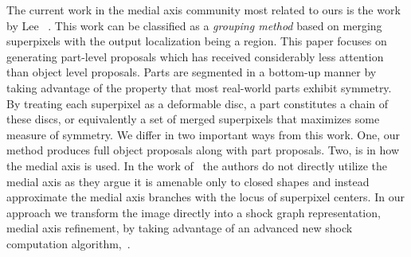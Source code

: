 The current work in the medial axis community most related to ours is the work by Lee \etal~\cite{Lee:Fidler:Dickinson:ICCV13}. This work can be classified as a \emph{grouping method} based on merging superpixels with the output localization being a region. This paper focuses on generating part-level proposals which has received considerably less attention than object level proposals. Parts are segmented in a bottom-up manner by taking advantage of the property that most real-world parts exhibit symmetry. By treating each superpixel as a deformable disc, a part constitutes a chain of these discs, or equivalently a set of merged superpixels that maximizes some measure of symmetry. We differ in two important ways from this work. One, our method produces full object proposals along with part proposals. Two, is in how the medial axis is used. In the work of~\cite{Lee:Fidler:Dickinson:ICCV13} the authors do not directly utilize the medial axis as they argue it is amenable only to closed shapes and instead approximate the medial axis branches with the locus of superpixel centers. In our approach we transform the image directly into a shock graph representation, medial axis refinement, by taking advantage of an advanced new shock computation algorithm,~\cite{Tamrakar:Kimia:Shock}.








 


